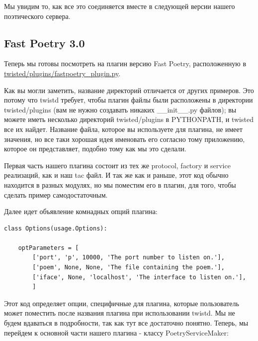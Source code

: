Мы увидим то, как все это соединяется вместе в следующей версии нашего 
поэтического сервера.


\subsection{Fast Poetry 3.0}

Теперь мы готовы посмотреть на плагин версию Fast Poetry, 
расположенную в  
\href{http://github.com/jdavisp3/twisted-intro/blob/master/twisted/plugins/fastpoetry\_plugin.py#L1}{twisted/plugins/fastpoetry\_plugin.py}.


Как вы могли заметить, название директорий отличается от других 
примеров. Это потому что twistd требует, чтобы плагин файлы 
были расположены в директории twisted/plugins (вам не нужно 
создавать никаких \_\_init\_\_.py файлов); вы можете иметь 
несколько директорий twisted/plugins в PYTHONPATH, 
и twisted все их найдет. Название файла, которое вы используете 
для плагина, не имеет значения, но все таки хорошая идея 
именовать его согласно тому приложению, которое он представляет, 
подобно тому как мы это сделали.


Первая часть нашего плагина состоит из тех же 
protocol, factory и service реализаций, как и наш 
tac файл. И так же как и раньше, этот код обычно находится 
в разных модулях, но мы поместим его в плагин, для того, чтобы 
сделать пример самодостаточным.


Далее идет объявление комнадных опций плагина:

\begin{scriptsize}\begin{verbatim}
class Options(usage.Options):

    optParameters = [
        ['port', 'p', 10000, 'The port number to listen on.'],
        ['poem', None, None, 'The file containing the poem.'],
        ['iface', None, 'localhost', 'The interface to listen on.'],
        ]
\end{verbatim}\end{scriptsize}


Этот код определяет опции, специфичные для плагина, которые 
пользователь может поместить после названия 
плагина при использовании twistd. Мы не будем вдаваться в 
подробности, так как тут все достаточно понятно. Теперь, мы 
перейдем к основной части нашего плагина - классу PoetryServiceMaker: 


